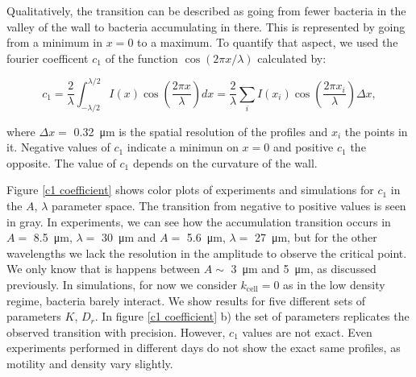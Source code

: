 Qualitatively, the transition can be described as going from fewer bacteria in the valley of the wall to bacteria accumulating in there. This is represented by going from a minimum in $x=0$ to a maximum. To quantify that aspect, we used the fourier coefficent $c_1$ of the function $\cos{(2\pi x/\lambda)}$ calculated by:

\begin{equation}
    c_1 = \frac{2}{\lambda}\int_{-\lambda/2}^{\lambda/2} I(x)\cos\left(\frac{2\pi x}{\lambda} \right)dx = \frac{2}{\lambda} \sum_i I(x_i) \cos\left(\frac{2\pi x_i}{\lambda} \right)\Delta x,
\end{equation}

where $\Delta x=$ \SI{0.32}{\micro\meter} is the spatial resolution of the profiles and $x_i$ the points in it. Negative values of $c_1$ indicate a minimun on $x=0$ and positive $c_1$ the opposite. The value of $c_1$ depends on the curvature of the wall. 


Figure \ref{c1 coefficient} shows color plots of experiments and simulations for $c_1$ in the $A$, $\lambda$ parameter space. The transition from negative to positive values is  seen in gray. In experiments, we can see how the accumulation transition occurs in $A= $ \SI{8.5}{\micro\meter}, $\lambda=$ \SI{30}{\micro\meter} and $A=$ \SI{5.6}{\micro\meter}, $\lambda= $ \SI{27}{\micro\meter}, but for the other wavelengths we lack the resolution in the amplitude to observe the critical point. We only know that is happens between $A\sim$ \SI{3}{\micro\meter} and \SI{5}{\micro\meter}, as discussed previously. In simulations, for now we consider $k_{\text{cell}}=0$ as in the low density regime, bacteria barely interact. We show results for five different sets of parameters $K$, $D_r$. In figure \ref{c1 coefficient} b) the set of parameters replicates the observed transition with precision. However, $c_1$ values are not exact. Even experiments performed in different days do not show the exact same profiles, as motility and density vary slightly.  

